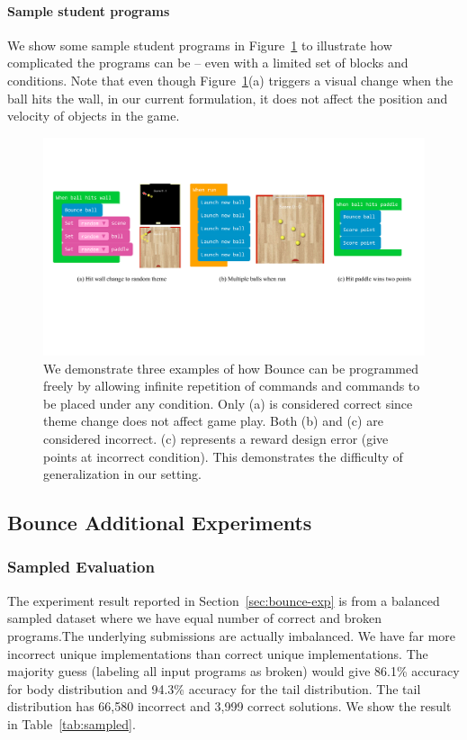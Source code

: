 \documentclass{article}
\begin{document}
\paragraph{Sample student programs}
We show some sample student programs in Figure~\ref{fig:program-invar} to illustrate how complicated the programs can be -- even with a limited set of blocks and conditions. Note that even though Figure~\ref{fig:program-invar}(a) triggers a visual change when the ball hits the wall, in our current formulation, it does not affect the position and velocity of objects in the game.

\begin{figure}[ht]
  \centering
  \includegraphics[width=\linewidth]{images/program_invars.pdf}
  \caption{We demonstrate three examples of how Bounce can be programmed freely by allowing infinite repetition of commands and commands to be placed under any condition. Only (a) is considered correct since theme change does not affect game play. Both (b) and (c) are considered incorrect. (c) represents a reward design error (give points at incorrect condition). This demonstrates the difficulty of generalization in our setting.}
  \label{fig:program-invar}
\end{figure}

 
\subsection{Bounce Additional Experiments}

\subsubsection{Sampled Evaluation}
The experiment result reported in Section~\ref{sec:bounce-exp} is from a balanced sampled dataset where we have equal number of correct and broken programs.The underlying submissions are actually imbalanced.  We have far more incorrect unique implementations than correct unique implementations. The majority guess (labeling all input programs as broken) would give 86.1\% accuracy for body distribution and 94.3\% accuracy for the tail distribution. The tail distribution has 66,580 incorrect and 3,999 correct solutions. We show the result in Table~\ref{tab:sampled}.
\end{document}
